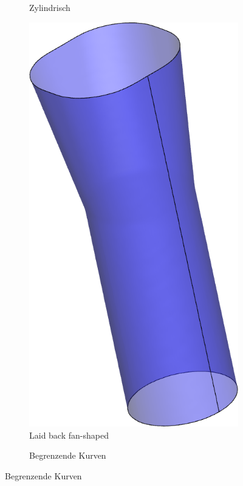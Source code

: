 \documentclass[8pt, aspectratio=169]{beamer}
\begin{document}
\begin{frame}
\begin{minipage}[t]{\textwidth}
\begin{figure}[H]
\begin{subfigure}{.15\textwidth}
				\vspace{1cm}				
				\caption{Zylindrisch}
			\end{subfigure}
			\begin{subfigure}{.3\textwidth}
				\centering
				\includegraphics[width=.5\textwidth]{../../tec/holes/15.png}
				\vspace{1cm}
				\caption{Laid back fan-shaped}
			\end{subfigure}
			\begin{subfigure}{.5\textwidth}
				
				\caption{Begrenzende Kurven}
			\end{subfigure}
		\end{figure}
	\end{minipage}
	\vfill
\end{frame}
\end{document}
